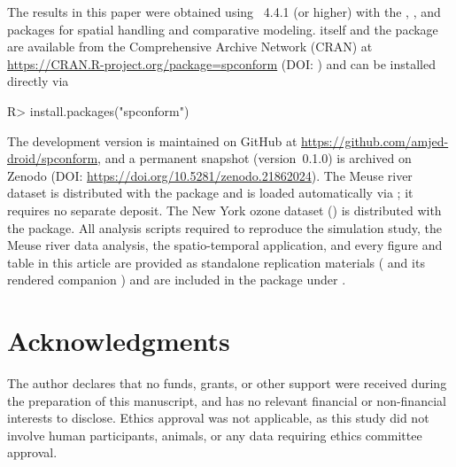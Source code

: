 \documentclass[article]{jss}
\begin{document}
The results in this paper were obtained using ~4.4.1 (or higher) with the  \citep{Pebesma+Bivand:2005},  \citep{Wood:2017}, and  \citep{Sahu:bmstdr} packages for spatial handling and comparative modeling.  itself and the  package are available from the Comprehensive  Archive Network (CRAN) at \url{https://CRAN.R-project.org/package=spconform} (DOI: ) and can be installed directly via
%
\begin{Code}
R> install.packages("spconform")
\end{Code}
%
The development version is maintained on GitHub at \url{https://github.com/amjed-droid/spconform}, and a permanent snapshot (version~0.1.0) is archived on Zenodo (DOI: \url{https://doi.org/10.5281/zenodo.21862024}). The Meuse river dataset is distributed with the  package and is loaded automatically via ; it requires no separate deposit. The New York ozone dataset () is distributed with the  package. All analysis scripts required to reproduce the simulation study, the Meuse river data analysis, the spatio-temporal application, and every figure and table in this article are provided as standalone replication materials ( and its rendered companion ) and are included in the package under .


\section*{Acknowledgments}

The author declares that no funds, grants, or other support were received during the preparation of this manuscript, and has no relevant financial or non-financial interests to disclose. Ethics approval was not applicable, as this study did not involve human participants, animals, or any data requiring ethics committee approval.



\end{document}
